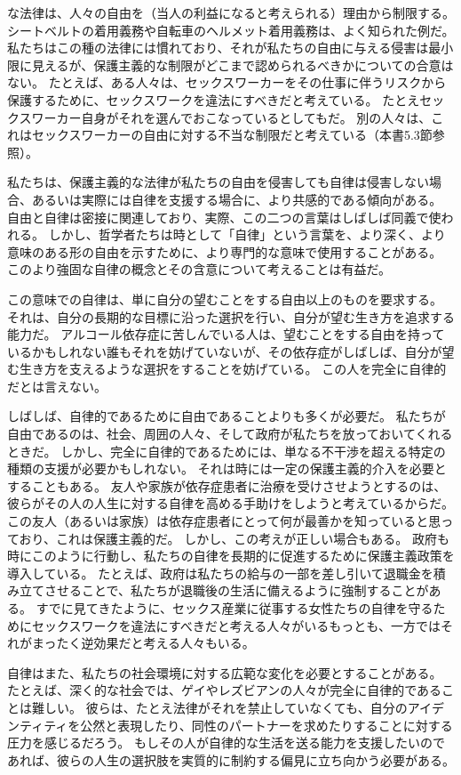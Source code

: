 \documentclass[paper=a4,book,openany]{jlreq} \usepackage{mystyle}
\begin{document}
な法律は、人々の自由を（当人の利益になると考えられる）理由から制限する。
シートベルトの着用義務や自転車のヘルメット着用義務は、よく知られた例だ。
私たちはこの種の法律には慣れており、それが私たちの自由に与える侵害は最小限に見えるが、保護主義的な制限がどこまで認められるべきかについての合意はない。
たとえば、ある人々は、セックスワーカーをその仕事に伴うリスクから保護するために、セックスワークを違法にすべきだと考えている。
たとえセックスワーカー自身がそれを選んでおこなっているとしてもだ。
別の人々は、これはセックスワーカーの自由に対する不当な制限だと考えている（本書5.3節参照）。

私たちは、保護主義的な法律が私たちの自由を侵害しても自律は侵害しない場合、あるいは実際には自律を支援する場合に、より共感的である傾向がある。
自由と自律は密接に関連しており、実際、この二つの言葉はしばしば同義で使われる。
しかし、哲学者たちは時として「自律」という言葉を、より深く、より意味のある形の自由を示すために、より専門的な意味で使用することがある。
このより強固な自律の概念とその含意について考えることは有益だ。

この意味での自律は、単に自分の望むことをする自由以上のものを要求する。
それは、自分の長期的な目標に沿った選択を行い、自分が望む生き方を追求する能力だ。
アルコール依存症に苦しんでいる人は、望むことをする自由を持っているかもしれない{\DDASH}誰もそれを妨げていない{\DDASH}が、その依存症がしばしば、自分が望む生き方を支えるような選択をすることを妨げている。
この人を完全に自律的だとは言えない。

しばしば、自律的であるために自由であることよりも多くが必要だ。
私たちが自由であるのは、社会、周囲の人々、そして政府が私たちを放っておいてくれるときだ。
しかし、完全に自律的であるためには、単なる不干渉を超える特定の種類の支援が必要かもしれない。
それは時には一定の保護主義的介入を必要とすることもある。
友人や家族が依存症患者に治療を受けさせようとするのは、彼らがその人の人生に対する自律を高める手助けをしようと考えているからだ。
この友人（あるいは家族）は依存症患者にとって何が最善かを知っていると思っており、これは保護主義的だ。
しかし、この考えが正しい場合もある。
政府も時にこのように行動し、私たちの自律を長期的に促進するために保護主義政策を導入している。
たとえば、政府は私たちの給与の一部を差し引いて退職金を積み立てさせることで、私たちが退職後の生活に備えるように強制することがある。
すでに見てきたように、セックス産業に従事する女性たちの自律を守るためにセックスワークを違法にすべきだと考える人々がいる{\DDASH}もっとも、一方ではそれがまったく逆効果だと考える人々もいる。

自律はまた、私たちの社会環境に対する広範な変化を必要とすることがある。
たとえば、深く的な社会では、ゲイやレズビアンの人々が完全に自律的であることは難しい。
彼らは、たとえ法律がそれを禁止していなくても、自分のアイデンティティを公然と表現したり、同性のパートナーを求めたりすることに対する圧力を感じるだろう。
もしその人が自律的な生活を送る能力を支援したいのであれば、彼らの人生の選択肢を実質的に制約する偏見に立ち向かう必要がある。
\end{document}
